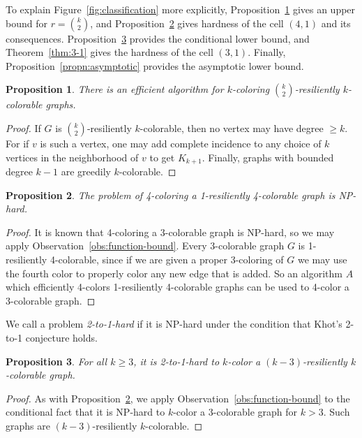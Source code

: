 \documentclass[10pt]{article}
\newtheorem{propn}{Proposition}
\begin{document}
To explain Figure~\ref{fig:classification} more explicitly,
Proposition~\ref{propn:k-choose-2-bound} gives an upper bound for $r=
\binom{k}{2}$, and Proposition~\ref{propn:4-1} gives hardness of the cell $(4,1)$
and its consequences. Proposition~\ref{propn:2-to-1-diagonal} provides the
conditional lower bound, and Theorem~\ref{thm:3-1} gives the hardness of the cell
$(3,1)$. Finally, Proposition~\ref{propn:asymptotic} provides the asymptotic
lower bound.

\begin{propn}\label{propn:k-choose-2-bound}
There is an efficient algorithm for $k$-coloring $\binom{k}{2}$-resiliently
$k$-colorable graphs.
\end{propn}
\begin{proof}
If $G$ is $\binom{k}{2}$-resiliently $k$-colorable, then no vertex may have
degree $ \geq k$. For if $v$ is such a vertex, one may add complete incidence to
any choice of $k$ vertices in the neighborhood of $v$ to get $K_{k+1}$. Finally,
graphs with bounded degree $k-1$ are greedily $k$-colorable. 
\end{proof}

\begin{propn}\label{propn:4-1}
The problem of 4-coloring a 1-resiliently 4-colorable graph is NP-hard.
\end{propn}
\begin{proof}
It is known that 4-coloring a 3-colorable graph is NP-hard, so we may apply
Observation~\ref{obs:function-bound}. Every 3-colorable graph $G$ is
1-resiliently 4-colorable, since if we are given a proper 3-coloring of $G$ we
may use the fourth color to properly color any new edge that is added. So an
algorithm $A$ which efficiently 4-colors 1-resiliently 4-colorable graphs can be
used to 4-color a 3-colorable graph.
\end{proof}

We call a problem \emph{2-to-1-hard} if it is NP-hard under the condition that
Khot's 2-to-1 conjecture holds.

\begin{propn}\label{propn:2-to-1-diagonal}
For all $k \geq 3$, it is 2-to-1-hard to $k$-color a $(k-3)$-resiliently
$k$-colorable graph. 
\end{propn}
\begin{proof}
As with Proposition~\ref{propn:4-1}, we apply Observation~\ref{obs:function-bound}
to the conditional fact that it is NP-hard to $k$-color a 3-colorable graph for
$k > 3$. Such graphs are $(k-3)$-resiliently $k$-colorable.
\end{proof}
\end{document}
